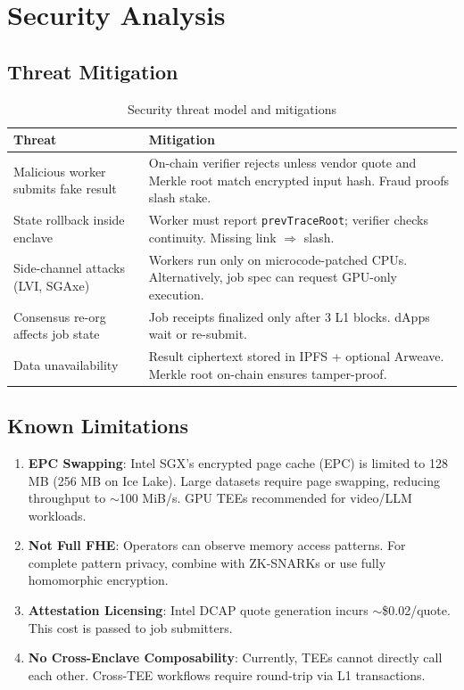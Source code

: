 \section{Security Analysis}


\subsection{Threat Mitigation}

\begin{table}[h]
\centering
\small
\begin{tabular}{@{}p{4cm}p{8cm}@{}}
\toprule
\textbf{Threat} & \textbf{Mitigation} \\
\midrule
Malicious worker submits fake result & On-chain verifier rejects unless vendor quote and Merkle root match encrypted input hash. Fraud proofs slash stake. \\
\midrule
State rollback inside enclave & Worker must report \texttt{prevTraceRoot}; verifier checks continuity. Missing link $\Rightarrow$ slash. \\
\midrule
Side-channel attacks (LVI, SGAxe) & Workers run only on microcode-patched CPUs. Alternatively, job spec can request GPU-only execution. \\
\midrule
Consensus re-org affects job state & Job receipts finalized only after 3 L1 blocks. dApps wait or re-submit. \\
\midrule
Data unavailability & Result ciphertext stored in IPFS + optional Arweave. Merkle root on-chain ensures tamper-proof. \\
\bottomrule
\end{tabular}
\caption{Security threat model and mitigations}
\label{tab:security}
\end{table}

\subsection{Known Limitations}

\begin{enumerate}
  \item \textbf{EPC Swapping}: Intel SGX's encrypted page cache (EPC) is limited to 128 MB (256 MB on Ice Lake). Large datasets require page swapping, reducing throughput to $\sim$100 MiB/s. GPU TEEs recommended for video/LLM workloads.

  \item \textbf{Not Full FHE}: Operators can observe memory access patterns. For complete pattern privacy, combine with ZK-SNARKs or use fully homomorphic encryption.

  \item \textbf{Attestation Licensing}: Intel DCAP quote generation incurs $\sim$\$0.02/quote. This cost is passed to job submitters.

  \item \textbf{No Cross-Enclave Composability}: Currently, TEEs cannot directly call each other. Cross-TEE workflows require round-trip via L1 transactions.
\end{enumerate}

